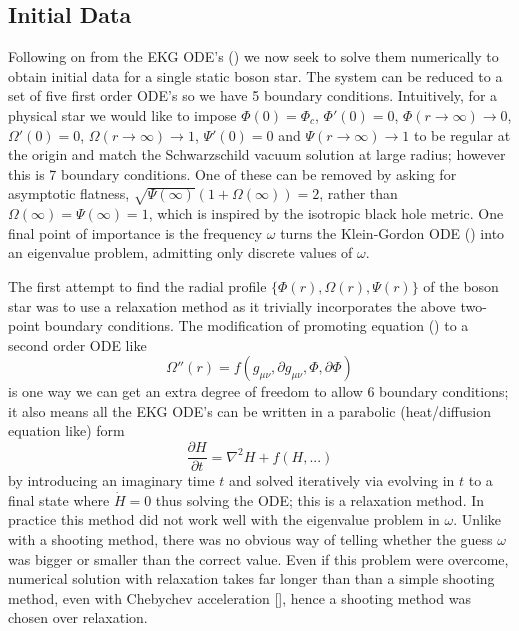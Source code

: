 \subsection{Initial Data}
Following on from the EKG ODE's () we now seek to solve them numerically to obtain initial data for a single static boson star. The system can be reduced to a set of five first order ODE's so we have 5 boundary conditions. Intuitively, for a physical star we would like to impose $\Phi(0) = \Phi_c$, $\Phi'(0)=0$, $\Phi(r\rightarrow\infty)\rightarrow0$, $\Omega'(0)=0$, $\Omega(r\rightarrow\infty)\rightarrow1$, $\Psi'(0)=0$ and $\Psi(r\rightarrow\infty)\rightarrow1$ to be regular at the origin and match the Schwarzschild vacuum solution at large radius; however this is 7 boundary conditions. One of these can be removed by asking for asymptotic flatness, $\sqrt{\Psi(\infty)}\left(1+\Omega(\infty)\right)=2$, rather than $\Omega(\infty)=\Psi(\infty)=1$, which is inspired by the isotropic black hole metric. One final point of importance is the frequency $\omega$ turns the Klein-Gordon ODE () into an eigenvalue problem, admitting only discrete values of $\omega$.

The first attempt to find the radial profile $\{\Phi(r),\Omega(r),\Psi(r)\}$ of the boson star was to use a relaxation method as it trivially incorporates the above two-point boundary conditions. The modification of promoting equation () to a second order ODE like \[\Omega''(r) = f(g_{\mu\nu},\partial g_{\mu\nu},\Phi,\partial \Phi)\]
is one way we can get an extra degree of freedom to allow 6 boundary conditions; it also means all the EKG ODE's can be written in a parabolic (heat/diffusion equation like) form
\[ \frac{\partial H}{\partial t}  = \nabla^2 H + f(H,...) \]
by introducing an imaginary time $t$ and solved iteratively via evolving in $t$ to a final state where $\dot{H}=0$ thus solving the ODE; this is a relaxation method. In practice this method did not work well with the eigenvalue problem in $\omega$. Unlike with a shooting method, there was no obvious way of telling whether the guess $\omega$ was bigger or smaller than the correct value. Even if this problem were overcome, numerical solution with relaxation takes far longer than than a simple shooting method, even with Chebychev acceleration [], hence a shooting method was chosen over relaxation.

